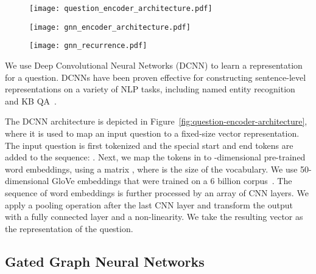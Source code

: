 \documentclass[11pt]{article}
\begin{document}
\begin{figure}[t]
  \begin{minipage}{0.49\linewidth}
\begin{center}
\texttt{[image: question\_encoder\_architecture.pdf]}
\end{center}
\end{minipage}\hfill \begin{minipage}{0.49\linewidth}
   \begin{center}
    \texttt{[image: gnn\_encoder\_architecture.pdf]}
    \end{center}
\begin{center}
      \texttt{[image: gnn\_recurrence.pdf]}
      \end{center}
  \end{minipage}
\end{figure}

We use Deep Convolutional Neural Networks (DCNN) to learn a representation for a question. DCNNs have been proven effective for constructing sentence-level representations on a variety of NLP tasks, including named entity recognition~\cite{Strubell2017} and KB QA~\cite{Yih2015,Dong2015}.  

The DCNN architecture is depicted in Figure~\ref{fig:question-encoder-architecture}, where it is used to map an input question to a fixed-size vector representation. The input question is first tokenized and the special start and end tokens are added to the sequence: .
Next, we map the tokens in  to -dimensional pre-trained word embeddings, using a matrix , where  is the size of the vocabulary. We use 50-dimensional GloVe embeddings that were trained on a 6 billion corpus~\cite{Pennington2014}. 
The sequence of word embeddings is further processed by an array of CNN layers. 
We apply a pooling operation after the last CNN layer and transform the output with a fully connected layer  and a  non-linearity. We take the resulting vector  as the representation of the question.

\subsection{Gated Graph Neural Networks}
\label{sec:ggnn}
\end{document}
